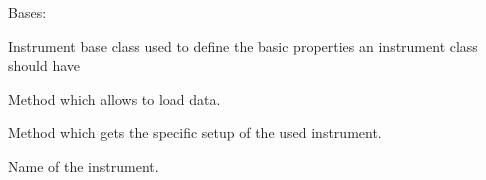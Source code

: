 \documentclass[a4paper,10pt,english]{sphinxmanual}
\begin{document}

\begin{fulllineitems}
\label{\detokenize{cascade.instruments:cascade.instruments.instruments.InstrumentBase}}
Bases: 

Instrument base class used to define the basic properties an instrument
class should have

\begin{fulllineitems}
\label{\detokenize{cascade.instruments:cascade.instruments.instruments.InstrumentBase.load_data}}
Method which allows to load data.

\end{fulllineitems}


\begin{fulllineitems}
\label{\detokenize{cascade.instruments:cascade.instruments.instruments.InstrumentBase.get_instrument_setup}}
Method which gets the specific setup of the used instrument.

\end{fulllineitems}


\begin{fulllineitems}
\label{\detokenize{cascade.instruments:cascade.instruments.instruments.InstrumentBase.name}}
Name of the instrument.

\end{fulllineitems}


\end{fulllineitems}

\end{document}
